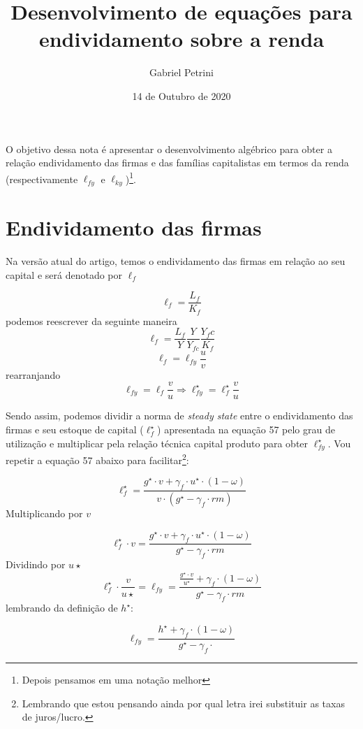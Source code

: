 \documentclass[11pt]{article}
\author{Gabriel Petrini}
\date{14 de Outubro de 2020}
\title{Desenvolvimento de equações para endividamento sobre a renda}
\begin{document}
\maketitle
O objetivo dessa nota é apresentar o desenvolvimento algébrico para obter a relação endividamento das firmas e das famílias capitalistas em termos da renda (respectivamente \(\ell_{fy}\) e \(\ell_{ky}\))\footnote{Depois pensamos em uma notação melhor}. 

\section*{Endividamento das firmas}
\label{sec:org5448064}

Na versão atual do artigo, temos o endividamento das firmas em relação ao seu capital e será denotado por \(\ell_f\)

$$
\ell_f = \frac{L_f}{K_f}
$$
podemos reescrever da seguinte maneira
$$
\ell_f = \frac{L_f}{Y}\frac{Y}{Y_{fc}}\frac{Y_fc}{K_f}
$$
$$
\ell_f = \ell_{fy}\frac{u}{v}
$$
rearranjando
$$
\ell_{fy} = \ell_f\frac{v}{u} \Rightarrow \ell_{fy}^\star = \ell_f^\star\frac{v}{u}
$$

Sendo assim, podemos dividir a norma de \emph{steady state} entre o endividamento das firmas e seu estoque de capital (\(\ell_f^\star\)) apresentada na equação 57 pelo grau de utilização e multiplicar pela relação técnica capital produto para obter \(\ell_{fy}^\star\). Vou repetir a equação 57 abaixo para facilitar\footnote{Lembrando que estou pensando ainda por qual letra irei substituir as taxas de juros/lucro.}:

\begin{equation}
\tag{57}
\ell_f^\star = \frac{g^\star\cdot v + \gamma_f\cdot u^\star\cdot (1-\omega)}{v\cdot (g^\star - \gamma_f \cdot rm)}
\end{equation}
Multiplicando por \(v\)

\begin{equation}
\ell_f^\star\cdot v = \frac{g^\star\cdot v + \gamma_f\cdot u^\star\cdot (1-\omega)}{g^\star - \gamma_f \cdot rm}
\end{equation}
Dividindo por \(u\star\)
\begin{equation}
\ell_f^\star\cdot \frac{v}{u\star} = \ell_{fy} = \frac{\frac{g^\star\cdot v}{u^\star} + \gamma_f\cdot (1-\omega)}{g^\star - \gamma_f\cdot rm}
\end{equation}
lembrando da definição de \(h^\star\):

\begin{equation}
\label{endiv_firm}
\ell_{fy} = \frac{h^\star + \gamma_f\cdot (1-\omega)}{g^\star - \gamma_f\cdot}
\end{equation}
\end{document}

